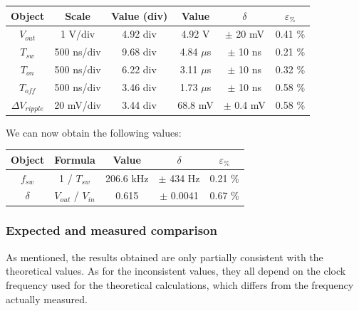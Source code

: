 \documentclass[../main.tex]{subfiles}
\begin{document}
\begin{center}
\begin{tabular}{c c c c c c}
\textbf{Object} & \textbf{Scale} & \textbf{Value (div)} & \textbf{Value} & $\delta$ & $\varepsilon_{\%}$ \\

\hline
 $V_{out}$ & 1 V/div &  4.92 div & 4.92 V & $\pm$ 20 mV & 0.41  \% \\ 
\hline
 $T_{sw}$ & 500 ns/div & 9.68 div & 4.84 $\mu$s & $\pm$ 10 ns & 0.21 \% \\ 
 \hline
$T_{on}$ & 500 ns/div & 6.22 div & 3.11 $\mu$s & $\pm$ 10 ns  & 0.32 \% \\ 
 \hline
 $T_{off}$ & 500 ns/div & 3.46 div & 1.73 $\mu$s &$\pm$ 10 ns & 0.58 \% \\ 
  \hline
 $\Delta V_{ripple}$ & 20 mV/div & 3.44 div & 68.8 mV &$\pm$ 0.4 mV & 0.58 \% \\ 
\end{tabular}
\end{center}

We can now obtain the following values:

\begin{center}
\begin{tabular}{c c c c c}
\textbf{Object} & \textbf{Formula}  & \textbf{Value} & $\delta$ & $\varepsilon_{\%}$ \\

\hline
$f_{sw}$ &  1 / $T_{sw}$ & 206.6 kHz & $\pm$ 434 Hz & 0.21 \% \\ 
\hline
$\delta$ &  $V_{out}$ / $V_{in}$ &  0.615 & $\pm$ 0.0041 & 0.67 \% \\ 

\end{tabular}
\end{center}

\subsubsection*{Expected and measured comparison}

As mentioned, the results obtained are only partially consistent with the theoretical values. As for the inconsistent values, they all depend on the clock frequency used for the theoretical calculations, which differs from the frequency actually measured.





\vspace{1cm}
\end{document}
